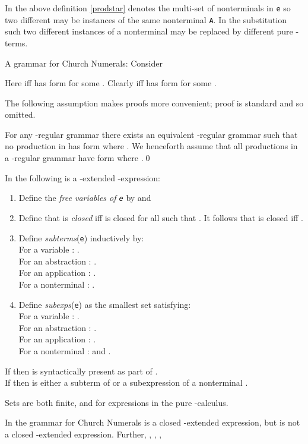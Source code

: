 \documentclass{LMCS}
\newcommand{\fl}{\noindent}
\newcommand{\vair}{\relax}
\newcommand{\be}{\begin{enumerate}}
\newcommand{\ee}{\end{enumerate}}
\newcommand{\bdfn}{\begin{defi}}
\newcommand{\edfn}{\end{defi}}
\newcommand{\blem}{\begin{lem}}
\newcommand{\elem}{\end{lem}}
\theoremstyle{definition}\newtheorem{env}[thm]{Environment}
\begin{document}
In the above definition \ref{prodstar}  denotes the multi-set of nonterminals in {\tt e} so two different  may be instances of the same nonterminal {\tt A}. In the substitution  such two different instances of a nonterminal may be replaced by different pure -terms. 



\begin{exa} A grammar for Church Numerals: Consider

Here  iff  has form
 for some . 
Clearly  iff  has form
 for some
. 

\end{exa}
\fl
The following  assumption makes proofs more convenient; proof is standard and so omitted.
\blem For any -regular grammar  there exists an equivalent -regular grammar  such that  no production in  has form  where . We henceforth assume that all productions in a -regular grammar have form  where 
.\qed 
\elem


\bdfn \label{def-fv-subexp} In the following   is a -extended -expression:\hfill
\be[(1)]
\item Define the {\em free variables of {\tt e}} by  and  
\vair

\item Define that  is {\em closed} iff  is closed for all  such that .
It follows that  is closed iff .
\vair

\item 
Define {\em subterms}({\tt e}) inductively by: \\
For a variable : .\\
For an abstraction : .\\
For an application : .\\
For a nonterminal : .
\vair

\item Define {\em subexps}({\tt e}) as the smallest set satisfying:\\
For a variable : .\\
For an abstraction : .\\
For an application : .\\
For a nonterminal :  and .
\ee
\edfn
\fl If  then  is syntactically present as part of .\\
If  then  is either a subterm of  or a subexpression of a nonterminal . 

Sets  are both finite, and  for expressions  in the pure -calculus.

\begin{exa} In the grammar for Church Numerals
 is a closed -extended expression, but
 is not a closed -extended expression.
Further,
, 
,
, 
\end{exa}
\end{document}
